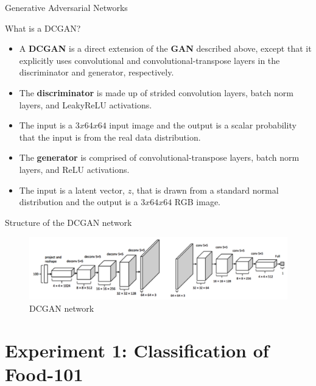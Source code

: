 \documentclass[10pt]{beamer}
\begin{document}
{
\begin{frame}{Generative Adversarial Networks}
      \begin{block}{What is a DCGAN?}
	\begin{itemize}[<+- | alert@+>]
    \item A \textbf{DCGAN} is a direct extension of the \textbf{GAN} described above, except that it explicitly uses convolutional and convolutional-transpose layers in the discriminator and generator, respectively.
    \item The \textbf{discriminator} is made up of strided convolution layers, batch norm layers, and LeakyReLU activations. 
    \item The input is a $3x64x64$ input image and the output is a scalar probability that the input is from the real data distribution. 
    \item The \textbf{generator} is comprised of convolutional-transpose layers, batch norm layers, and ReLU activations.
    \item The input is a latent vector, $z$, that is drawn from a standard normal distribution and the output is a $3x64x64$ RGB image.
  \end{itemize}
    \end{block}
\end{frame}
}

{
\begin{frame}{Structure of the DCGAN network}
\begin{figure}[htbp] 
  \centering
     \includegraphics[width=1.0\textwidth]{pic/structure_dcgan.png}
  \caption{DCGAN network}
  \label{fig:Bild1}
\end{figure}
\end{frame}
}

\section{Experiment 1: Classification of Food-101}
\end{document}
